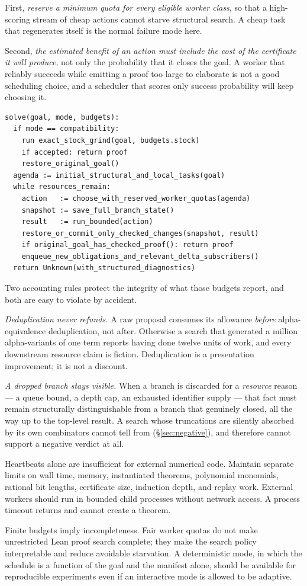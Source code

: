First, \emph{reserve a minimum quota for every eligible worker class}, so that
a high-scoring stream of cheap actions cannot starve structural search. A cheap
task that regenerates itself is the normal failure mode here.

Second, \emph{the estimated benefit of an action must include the cost of the
certificate it will produce}, not only the probability that it closes the goal.
A worker that reliably succeeds while emitting a proof too large to elaborate
is not a good scheduling choice, and a scheduler that scores only success
probability will keep choosing it.

\begin{lstlisting}
solve(goal, mode, budgets):
  if mode == compatibility:
    run exact_stock_grind(goal, budgets.stock)
    if accepted: return proof
    restore_original_goal()
  agenda := initial_structural_and_local_tasks(goal)
  while resources_remain:
    action   := choose_with_reserved_worker_quotas(agenda)
    snapshot := save_full_branch_state()
    result   := run_bounded(action)
    restore_or_commit_only_checked_changes(snapshot, result)
    if original_goal_has_checked_proof(): return proof
    enqueue_new_obligations_and_relevant_delta_subscribers()
  return Unknown(with_structured_diagnostics)
\end{lstlisting}

Two accounting rules protect the integrity of what those budgets report, and
both are easy to violate by accident.

\emph{Deduplication never refunds.} A raw proposal consumes its allowance
\emph{before} alpha-equivalence deduplication, not after. Otherwise a search
that generated a million alpha-variants of one term reports having done twelve
units of work, and every downstream resource claim is fiction. Deduplication is
a presentation improvement; it is not a discount.

\emph{A dropped branch stays visible.} When a branch is discarded for a
\emph{resource} reason --- a queue bound, a depth cap, an exhausted identifier
supply --- that fact must remain structurally distinguishable from a branch
that genuinely closed, all the way up to the top-level result. A search whose
truncations are silently absorbed by its own combinators cannot tell
 from  (\S\ref{sec:negative}), and therefore
cannot support a negative verdict at all.

Heartbeats alone are insufficient for external numerical code. Maintain
separate limits on wall time, memory, instantiated theorems, polynomial
monomials, rational bit lengths, certificate size, induction depth, and replay
work. External workers should run in bounded child processes without network
access. A process timeout returns \unknown{} and cannot create a theorem.

Finite budgets imply incompleteness. Fair worker quotas do not make
unrestricted Lean proof search complete; they make the search policy
interpretable and reduce avoidable starvation. A deterministic mode, in which
the schedule is a function of the goal and the manifest alone, should be
available for reproducible experiments even if an interactive mode is allowed
to be adaptive.
